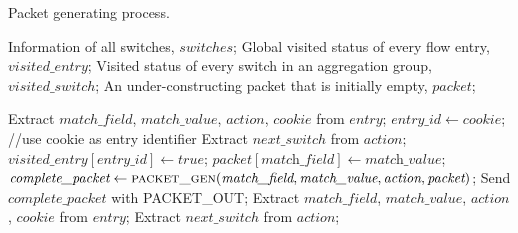 \begin {tcolorbox}[blanker,float=tbp,
grow to left by=1cm, grow to right by=1cm]
\begin{algorithm}[H]

  \caption{Packet generating process.}
  \begin{algorithmic}[1]
    \Require
      Information of all switches, $switches$;
      Global visited status of every flow entry, $visited\_entry$;  
      Visited status of every switch in an aggregation group, $visited\_switch$;
      An under-constructing packet that is initially empty, $packet$; 

          \State Extract $match\_field$, $match\_value$, $action$, $cookie$ from $entry$;
          \State $entry\_id \gets \textit{cookie}$; //use cookie as entry identifier
          \State 
          \State Extract $next\_switch$ from $action$;
            \State $\textit{visited\_entry}[\textit{entry\_id}] \gets true$;
            \State $packet[\textit{match\_field}] \gets \textit{match\_value}$;
            \State $\textit{complete\_packet} \gets \Call{packet\_gen}{\textit{match\_field}, \textit{match\_value}, \textit{action}, \textit{packet}}$;
            \State Send $\textit{complete\_packet}$ with PACKET\_OUT;
          \EndIf
      \EndFor
        \EndFor
    \EndFunction
    \State
        \State Extract $match\_field$, $match\_value$, $action$, $cookie$ from $entry$;
        \State Extract $next\_switch$ from $action$; 
  \end{algorithmic}
\end{algorithm}
\end{tcolorbox}

